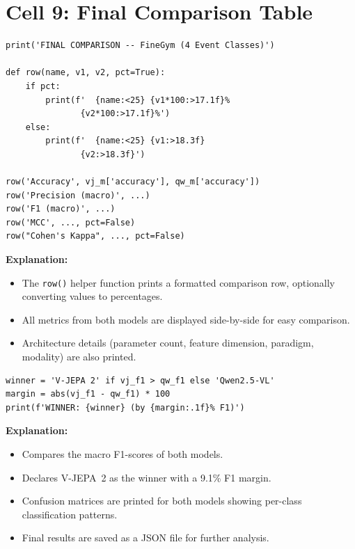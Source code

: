 \documentclass[a4paper, 12pt]{article}
\newenvironment{explanation}{%
  \par\smallskip
  \noindent\textcolor{blue!70!black}{\textbf{Explanation:}}\\
  \noindent
}{\par\medskip}
\begin{document}
\section{Cell 9: Final Comparison Table}

\begin{lstlisting}
print('FINAL COMPARISON -- FineGym (4 Event Classes)')

def row(name, v1, v2, pct=True):
    if pct:
        print(f'  {name:<25} {v1*100:>17.1f}%
               {v2*100:>17.1f}%')
    else:
        print(f'  {name:<25} {v1:>18.3f}
               {v2:>18.3f}')

row('Accuracy', vj_m['accuracy'], qw_m['accuracy'])
row('Precision (macro)', ...)
row('F1 (macro)', ...)
row('MCC', ..., pct=False)
row("Cohen's Kappa", ..., pct=False)
\end{lstlisting}

\begin{explanation}
\begin{itemize}[nosep]
  \item The \texttt{row()} helper function prints a formatted comparison row, optionally converting values to percentages.
  \item All metrics from both models are displayed side-by-side for easy comparison.
  \item Architecture details (parameter count, feature dimension, paradigm, modality) are also printed.
\end{itemize}
\end{explanation}

\begin{lstlisting}
winner = 'V-JEPA 2' if vj_f1 > qw_f1 else 'Qwen2.5-VL'
margin = abs(vj_f1 - qw_f1) * 100
print(f'WINNER: {winner} (by {margin:.1f}% F1)')
\end{lstlisting}

\begin{explanation}
\begin{itemize}[nosep]
  \item Compares the macro F1-scores of both models.
  \item Declares V-JEPA~2 as the winner with a 9.1\% F1 margin.
  \item Confusion matrices are printed for both models showing per-class classification patterns.
  \item Final results are saved as a JSON file for further analysis.
\end{itemize}
\end{explanation}
\end{document}
